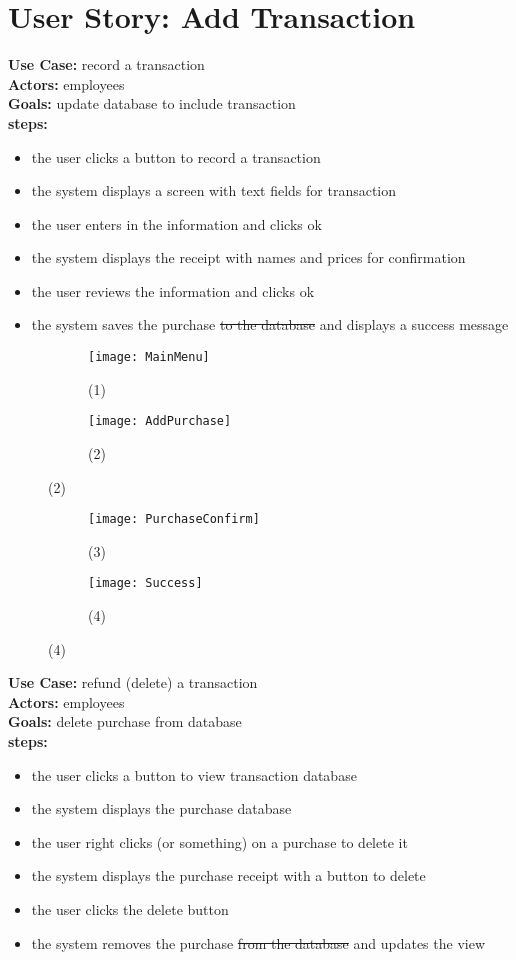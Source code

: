 \documentclass[notitlepage,11pt]{article}
\begin{document}
\section{User Story: Add Transaction}
	\textbf{Use Case:} record a transaction\\
	\textbf{Actors:} employees\\
	\textbf{Goals:} update database to include transaction\\
	\textbf{steps:}
	\begin{itemize}
		\item[(1)] the user clicks a button to record a transaction
		\item[(2)] the system displays a screen with text fields for transaction
		\item the user enters in the information and clicks ok
		\item[(3)] the system displays the receipt with names and prices for confirmation
		\item the user reviews the information and clicks ok
		\item[(4)] the system saves the purchase \sout{to the database} and displays a success message
	\end{itemize}
\begin{figure}[h]
	\begin{subfigure}{.5\textwidth}
	\centering
	\texttt{[image: MainMenu]}
	\caption{(1)}
	\end{subfigure}%
	\begin{subfigure}{.5\textwidth}
	\centering
	\texttt{[image: AddPurchase]}
	\caption{(2)}
	\end{subfigure}
\end{figure}
\begin{figure}[h]
	\begin{subfigure}{.5\textwidth}
	\centering
	\texttt{[image: PurchaseConfirm]}
	\caption{(3)}
	\end{subfigure}%
	\begin{subfigure}{.5\textwidth}
	\centering
	\texttt{[image: Success]}
	\caption{(4)}
	\end{subfigure}
\end{figure}
	\textbf{Use Case:} refund (delete) a transaction\\
	\textbf{Actors:} employees\\
	\textbf{Goals:} delete purchase from database\\
	\textbf{steps:}
	\begin{itemize}
		\item[(1)] the user clicks a button to view transaction database
		\item[(2)] the system displays the purchase database
		\item the user right clicks (or something) on a purchase to delete it
		\item[(3)] the system displays the purchase receipt with a button to delete
		\item the user clicks the delete button
		\item[(2)] the system removes the purchase \sout{from the database} and updates the view
	\end{itemize}
\end{document}
